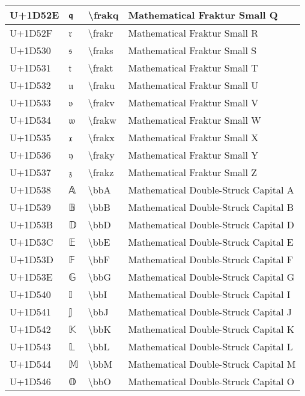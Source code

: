 \begin{table}[h]
\begin{tabulary}{\linewidth}{|L|L|L|L|}
\hline
U+1D52E & 𝔮 & {\textbackslash}frakq & Mathematical Fraktur Small Q \\
\hline
U+1D52F & 𝔯 & {\textbackslash}frakr & Mathematical Fraktur Small R \\
\hline
U+1D530 & 𝔰 & {\textbackslash}fraks & Mathematical Fraktur Small S \\
\hline
U+1D531 & 𝔱 & {\textbackslash}frakt & Mathematical Fraktur Small T \\
\hline
U+1D532 & 𝔲 & {\textbackslash}fraku & Mathematical Fraktur Small U \\
\hline
U+1D533 & 𝔳 & {\textbackslash}frakv & Mathematical Fraktur Small V \\
\hline
U+1D534 & 𝔴 & {\textbackslash}frakw & Mathematical Fraktur Small W \\
\hline
U+1D535 & 𝔵 & {\textbackslash}frakx & Mathematical Fraktur Small X \\
\hline
U+1D536 & 𝔶 & {\textbackslash}fraky & Mathematical Fraktur Small Y \\
\hline
U+1D537 & 𝔷 & {\textbackslash}frakz & Mathematical Fraktur Small Z \\
\hline
U+1D538 & 𝔸 & {\textbackslash}bbA & Mathematical Double-Struck Capital A \\
\hline
U+1D539 & 𝔹 & {\textbackslash}bbB & Mathematical Double-Struck Capital B \\
\hline
U+1D53B & 𝔻 & {\textbackslash}bbD & Mathematical Double-Struck Capital D \\
\hline
U+1D53C & 𝔼 & {\textbackslash}bbE & Mathematical Double-Struck Capital E \\
\hline
U+1D53D & 𝔽 & {\textbackslash}bbF & Mathematical Double-Struck Capital F \\
\hline
U+1D53E & 𝔾 & {\textbackslash}bbG & Mathematical Double-Struck Capital G \\
\hline
U+1D540 & 𝕀 & {\textbackslash}bbI & Mathematical Double-Struck Capital I \\
\hline
U+1D541 & 𝕁 & {\textbackslash}bbJ & Mathematical Double-Struck Capital J \\
\hline
U+1D542 & 𝕂 & {\textbackslash}bbK & Mathematical Double-Struck Capital K \\
\hline
U+1D543 & 𝕃 & {\textbackslash}bbL & Mathematical Double-Struck Capital L \\
\hline
U+1D544 & 𝕄 & {\textbackslash}bbM & Mathematical Double-Struck Capital M \\
\hline
U+1D546 & 𝕆 & {\textbackslash}bbO & Mathematical Double-Struck Capital O \\

\end{tabulary}
\end{table}
